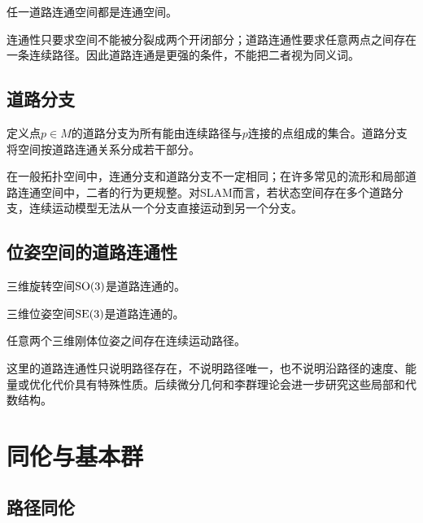 \begin{theorem}[道路连通推出连通]
任一道路连通空间都是连通空间。
\end{theorem}

\begin{remark}[反向一般不成立]
连通性只要求空间不能被分裂成两个开闭部分；道路连通性要求任意两点之间存在一条连续路径。因此道路连通是更强的条件，不能把二者视为同义词。
\end{remark}

\subsection{道路分支}

定义点$p\in M$的道路分支为所有能由连续路径与$p$连接的点组成的集合。道路分支将空间按道路连通关系分成若干部分。

\begin{remark}[连通分支与道路分支]
在一般拓扑空间中，连通分支和道路分支不一定相同；在许多常见的流形和局部道路连通空间中，二者的行为更规整。对SLAM而言，若状态空间存在多个道路分支，连续运动模型无法从一个分支直接运动到另一个分支。
\end{remark}

\subsection{位姿空间的道路连通性}

\begin{theorem}[$\SO(3)$道路连通]
三维旋转空间$\SO(3)$是道路连通的。
\end{theorem}

\begin{theorem}[$\SE(3)$道路连通]
三维位姿空间$\SE(3)$是道路连通的。
\end{theorem}

\begin{corollary}[连续位姿路径]
任意两个三维刚体位姿之间存在连续运动路径。
\end{corollary}

这里的道路连通性只说明路径存在，不说明路径唯一，也不说明沿路径的速度、能量或优化代价具有特殊性质。后续微分几何和李群理论会进一步研究这些局部和代数结构。


\section{同伦与基本群}

\subsection{路径同伦}

